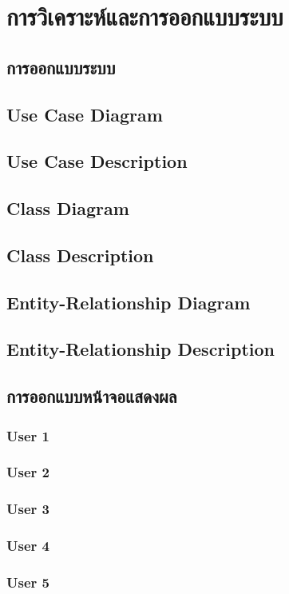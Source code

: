\baselineskip=8mm
\chapter{การวิเคราะห์และการออกแบบระบบ}

\renewcommand{\thesubsection}{\arabic{subsection}.}
\renewcommand{\theequation}{\thesection.\arabic{equation}}
\renewcommand{\thesection}{}


\section{การออกแบบระบบ}

\section{Use Case Diagram}

\section{Use Case Description}

\section{Class Diagram}

\section{Class Description}

\section{Entity-Relationship Diagram}

\section{Entity-Relationship Description}

\section{การออกแบบหน้าจอแสดงผล}

\subsection{User 1}

\subsection{User 2}

\subsection{User 3}

\subsection{User 4}

\subsection{User 5}

